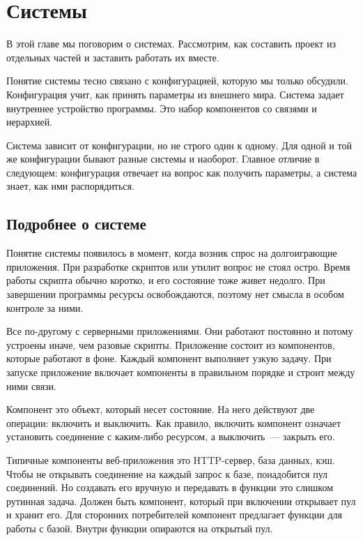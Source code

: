 \chapter{Системы}

\begin{teaser}
В этой главе мы поговорим о системах. Рассмотрим, как составить проект из
отдельных частей и заставить работать их вместе.
\end{teaser}

Понятие системы тесно связано с конфигурацией, которую мы только
обсудили. Конфигурация учит, как принять параметры из внешнего мира. Система
задает внутреннее устройство программы. Это набор компонентов со связями и
иерархией.

Система зависит от конфигурации, но не строго один к одному. Для одной и той же
конфигурации бывают разные системы и наоборот. Главное отличие в следующем:
конфигурация отвечает на вопрос как получить параметры, а система знает, как ими
распорядиться.

\section{Подробнее о системе}

Понятие системы появилось в момент, когда возник спрос на долгоиграющие
приложения. При разработке скриптов или утилит вопрос не стоял остро. Время
работы скрипта обычно коротко, и его состояние тоже живет недолго. При
завершении программы ресурсы освобождаются, поэтому нет смысла в особом контроле
за ними.

Все по-другому с серверными приложениями. Они работают постоянно и потому
устроены иначе, чем разовые скрипты. Приложение состоит из компонентов, которые
работают в фоне. Каждый компонент выполняет узкую задачу. При запуске приложение
включает компоненты в правильном порядке и строит между ними связи.

Компонент это объект, который несет состояние. На него действуют две операции:
включить и выключить. Как правило, включить компонент означает установить
соединение с каким-либо ресурсом, а выключить~--- закрыть его.

Типичные компоненты веб-приложения это HTTP-сервер, база данных, кэш. Чтобы не
открывать соединение на каждый запрос к базе, понадобится пул соединений. Но
создавать его вручную и передавать в функции это слишком рутинная задача. Должен
быть компонент, который при включении открывает пул и хранит его. Для сторонних
потребителей компонент предлагает функции для работы с базой. Внутри функции
опираются на открытый пул.

